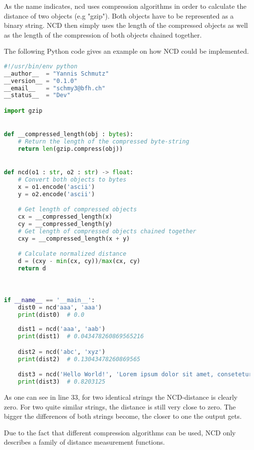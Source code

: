 As the name indicates, \ac{ncd} uses compression algorithms in order to calculate the distance of two objects (e.g "gzip"). Both objects have to be represented as a binary string. NCD then simply uses the length of the compressed objects as well as the length of the compression of both objects chained together.

The following Python code gives an example on how NCD could be implemented.

\begin{lstlisting}[language=Python]
#!/usr/bin/env python
__author__  = "Yannis Schmutz"
__version__ = "0.1.0"
__email__   = "schmy3@bfh.ch"
__status__  = "Dev"

import gzip


def __compressed_length(obj : bytes):
    # Return the length of the compressed byte-string
    return len(gzip.compress(obj))


def ncd(o1 : str, o2 : str) -> float:
    # Convert both objects to bytes
    x = o1.encode('ascii')
    y = o2.encode('ascii')

    # Get length of compressed objects
    cx = __compressed_length(x)
    cy = __compressed_length(y)
    # Get length of compressed objects chained together
    cxy = __compressed_length(x + y)

    # Calculate normalized distance
    d = (cxy - min(cx, cy))/max(cx, cy)
    return d



if __name__ == '__main__':
    dist0 = ncd'aaa', 'aaa')
    print(dist0)  # 0.0
    
    dist1 = ncd('aaa', 'aab')
    print(dist1)  # 0.043478260869565216

    dist2 = ncd('abc', 'xyz')
    print(dist2)  # 0.13043478260869565

    dist3 = ncd('Hello World!', 'Lorem ipsum dolor sit amet, consetetur sadipscing elitr, sed diam nonumy eirmod tempor invidunt ut labore et dolore magna aliquyam erat, sed diam voluptua.')
    print(dist3)  # 0.8203125
\end{lstlisting}


As one can see in line 33, for two identical strings the NCD-distance is clearly zero. For two quite similar strings, the distance is still very close to zero. The bigger the differences of both strings become, the closer to one the output gets.


Due to the fact that different compression algorithms can be used, NCD only describes a family of distance measurement functions.


